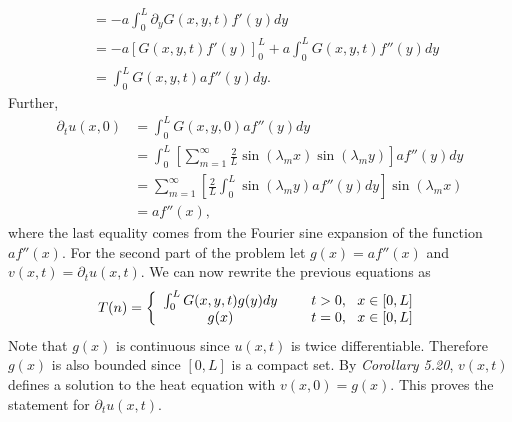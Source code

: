 \begin{questions}
\begin{solution}
\begin{align*}
&=-a\int_0^L\partial_yG(x,y,t)f'(y)dy\\
&=-a\left[G(x,y,t)f'(y)\right]_0^L+a\int_0^LG(x,y,t)f''(y)dy\\
&=\int_0^LG(x,y,t)af''(y)dy.
\end{align*}
Further,
\begin{align*}
\partial_tu(x,0)&=\int_0^LG(x,y,0)af''(y)dy\\
&=\int_0^L\left[\sum_{m=1}^{\infty}\frac{2}{L}\sin(\lambda_mx)\sin(\lambda_my)\right]af''(y)dy\\
&=\sum_{m=1}^{\infty}\left[\frac{2}{L}\int_0^L\sin(\lambda_my)af''(y)dy\right]\sin(\lambda_mx)\\
&=af''(x),
\end{align*}
where the last equality comes from the Fourier sine expansion of the function $af''(x)$. For the second part of the problem let $g(x)=af''(x)$ and $v(x,t)=\partial_tu(x,t)$. We can now rewrite the previous equations as
\begin{align*}
T(n) = \left\{ \begin{array}{cc} 
                \int_0^LG(x,y,t)g(y)dy & \hspace{5mm} t>0,~~x\in[0,L] \\
                g(x) & \hspace{5mm} t=0,~~x\in[0,L] \\
                \end{array} \right.
\end{align*}
Note that $g(x)$ is continuous since $u(x,t)$ is twice differentiable. Therefore $g(x)$ is also bounded since $[0,L]$ is a compact set. By \textsl{Corollary 5.20}, $v(x,t)$ defines a solution to the heat equation with $v(x,0)=g(x)$. This proves the statement for $\partial_t u(x,t)$.
\end{solution}
\end{questions}